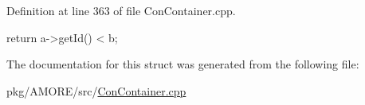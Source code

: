 Definition at line 363 of file ConContainer.cpp.


\begin{DoxyCode}
  {
    return a->getId() < b;
  }
\end{DoxyCode}


The documentation for this struct was generated from the following file:\begin{DoxyCompactItemize}
\item 
pkg/AMORE/src/\hyperlink{_con_container_8cpp}{ConContainer.cpp}\end{DoxyCompactItemize}
